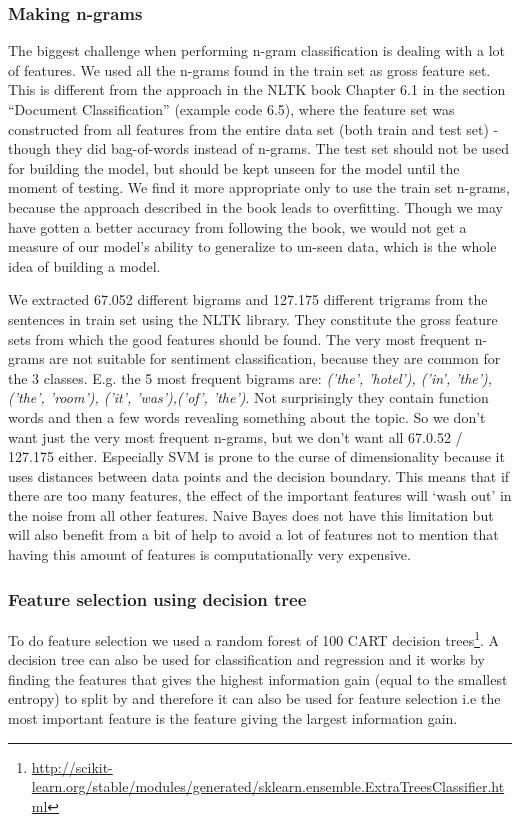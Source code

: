 \documentclass{article}
\begin{document}
\subsubsection{Making n-grams}
The biggest challenge when performing n-gram classification is dealing with a lot of features. 
We used all the n-grams found in the train set as gross feature set. This is different from the approach in the NLTK book Chapter 6.1 in the section “Document Classification” (example code 6.5), where the feature set was constructed from all features from the entire data set (both train and test set) - though they did bag-of-words instead of n-grams. The test set should not be used for building the model, but should be kept unseen for the model until the moment of testing. We find it more appropriate only to use the train set n-grams, because the approach described in the book leads to overfitting. Though we may have gotten a better accuracy from following the book, we would not get a measure of our model’s ability to generalize to un-seen data, which is the whole idea of building a model. 

We extracted 67.052 different bigrams and 127.175 different trigrams from the sentences in train set using the NLTK library. They constitute the gross feature sets from which the good features should be found. The very most frequent n-grams are not suitable for sentiment classification, because they are common for the 3 classes. E.g. the 5 most frequent bigrams are: \textit{('the', 'hotel'), ('in', 'the'), ('the', 'room'), ('it', 'was'),('of', 'the')}. Not surprisingly they contain function words and then a few words revealing something about the topic. So we don’t want just the very most frequent n-grams, but we don’t want all 67.0.52 / 127.175 either. Especially SVM is prone to the curse of dimensionality because it uses distances between data points and the decision boundary. This means that if there are too many features, the effect of the important features will ‘wash out’ in the noise from all other features. Naive Bayes does not have this limitation but will also benefit from a bit of help to avoid a lot of features not to mention that having this amount of features is computationally very expensive.

\subsubsection{Feature selection using decision tree}
To do feature selection we used a random forest of 100 CART decision trees\footnote{\url{http://scikit-learn.org/stable/modules/generated/sklearn.ensemble.ExtraTreesClassifier.html}}. A decision tree can also be used for classification and regression and it works by finding the features that gives the highest information gain (equal to the smallest entropy) to split by and therefore it can also be used for feature selection i.e the most important feature is the feature giving the largest information gain. 
\end{document}
